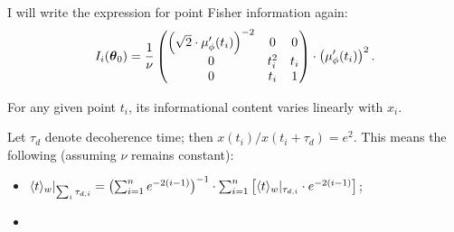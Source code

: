 \documentclass{article}
\begin{document}
I will write the expression for point Fisher information again:
\[
	\Fisher[i] = \frac{1}{\nu}\begin{pmatrix}
		\bkt{\sqrt{2}\cdot\mupp}^{-2} & 0     & 0   \\
		0                             & t_i^2 & t_i \\
		0                             & t_i   & 1
	\end{pmatrix}\cdot \bkt{\mupp}^2.
\]

For any given point $t_i$, its informational content varies linearly with $x_i$. 

Let $\tau_d$ denote decoherence time; then $x(t_i)/x(t_i + \tau_d) = e^2$. This means the following (assuming $\nu$ remains constant):
\begin{itemize}
	\item $\avg{t}_w|_{\sum_i\tau_{d,i}} = \bkt{\sum_{i=1}^n e^{-2(i-1)}}^{-1}\cdot \sum_{i=1}^n\bkt*{\avg{t}_w|_{\tau_{d,i}}\cdot e^{-2(i-1)}}$;
	\item 
\end{itemize}

\begin{figure}[h]
\end{figure}
\end{document}
